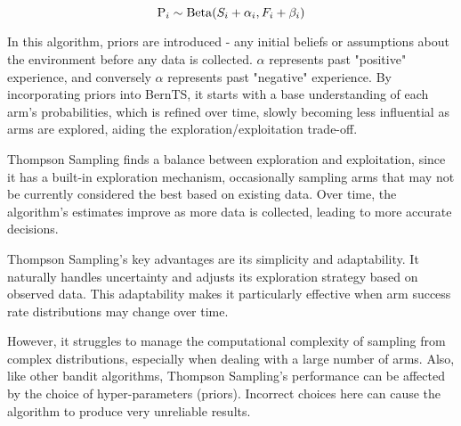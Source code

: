 $$\mathrm{P}_{i} \sim \mathrm{Beta}(S_i + \alpha_i, F_i + \beta_i)$$

In this algorithm, priors are introduced - any initial beliefs or assumptions about the environment before any data is collected. $\alpha$ represents past "positive" experience, and conversely $\alpha$ represents past "negative" experience. By incorporating priors into BernTS, it starts with a base understanding of each arm's probabilities, which is refined over time, slowly becoming less influential as arms are explored, aiding the exploration/exploitation trade-off.




Thompson Sampling finds a balance between exploration and exploitation, since it has a built-in exploration mechanism, occasionally sampling arms that may not be currently considered the best based on existing data. Over time, the algorithm's estimates improve as more data is collected, leading to more accurate decisions.

Thompson Sampling's key advantages are its simplicity and adaptability. It naturally handles uncertainty and adjusts its exploration strategy based on observed data. This adaptability makes it particularly effective when arm success rate distributions may change over time.

However, it struggles to manage the computational complexity of sampling from complex distributions, especially when dealing with a large number of arms. Also, like other bandit algorithms, Thompson Sampling's performance can be affected by the choice of hyper-parameters (priors). Incorrect choices here can cause the algorithm to produce very unreliable results.

